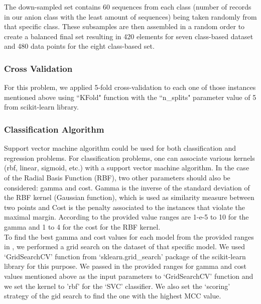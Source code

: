     The down-sampled set contains 60 sequences from each class (number of records in our anion class with 
    the least amount of sequences) being taken randomly from that specific class. These subsamples are then assembled in 
    a random order to create a balanced final set resulting in 420 elements for seven class-based 
    dataset and 480 data points for the eight class-based set.\\

    
    \subsubsection{Cross Validation}
    For this problem, we applied 5-fold cross-validation to each one of those instances mentioned above using 
    ``KFold" function with the ``n\_splits" parameter value of 5 from scikit-learn library.\\

   
    \subsubsection{Classification Algorithm}
    \label{subsub:scikitPredAlg}
    Support vector machine algorithm could be used for both classification and regression problems.
    For classification problems, one can associate various kernels (rbf, linear, sigmoid, etc.) with a support vector machine algorithm. 
    In the case of the Radial Basis Function (RBF), two other parameters should also be considered: gamma and cost. 
    Gamma is the inverse of the standard deviation of the RBF kernel (Gaussian function), which is used as similarity measure 
    between two points and Cost is the penalty associated to the instances that violate the maximal margin. According to 
    \cite{mishra2014prediction} the provided value ranges are 1-e-5 to 10 for the gamma and 1 to 4 for the cost for the RBF kernel.\\

    To find the best gamma and cost values for each model from the provided ranges in \cite{mishra2014prediction}, we performed 
    a grid search on the dataset of that specific model. We used `GridSearchCV' function from `sklearn.grid\_search' 
    package of the scikit-learn library for this purpose. We passed in the 
    provided ranges for gamma and cost values mentioned above as the input parameters to `GridSearchCV' function and we set 
    the kernel to 'rbf' for the `SVC' classifier. We also set the `scoring' strategy of the gid search to find the one with 
    the highest MCC value.\\

